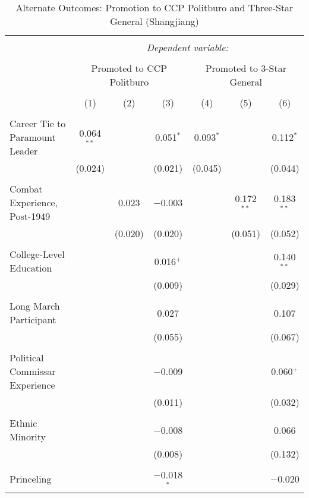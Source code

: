 
\begin{table}[!htbp] \centering 
  \caption{Alternate Outcomes: Promotion to CCP Politburo and Three-Star General (Shangjiang)} 
  \label{table_a4} 
\begin{tabular}{@{\extracolsep{5pt}}lcccccc} 
\\[-1.8ex]\hline 
\hline \\[-1.8ex] 
 & \multicolumn{6}{c}{\textit{Dependent variable:}} \\ 
\cline{2-7} 
\\[-1.8ex] & \multicolumn{3}{c}{Promoted to CCP Politburo} & \multicolumn{3}{c}{Promoted to 3-Star General} \\ 
\\[-1.8ex] & (1) & (2) & (3) & (4) & (5) & (6)\\ 
\hline \\[-1.8ex] 
 Career Tie to Paramount Leader & 0.064$^{**}$ &  & 0.051$^{*}$ & 0.093$^{*}$ &  & 0.112$^{*}$ \\ 
  & (0.024) &  & (0.021) & (0.045) &  & (0.044) \\ 
  & & & & & & \\ 
 Combat Experience, Post-1949 &  & 0.023 & $-$0.003 &  & 0.172$^{**}$ & 0.183$^{**}$ \\ 
  &  & (0.020) & (0.020) &  & (0.051) & (0.052) \\ 
  & & & & & & \\ 
 College-Level Education &  &  & 0.016$^{+}$ &  &  & 0.140$^{**}$ \\ 
  &  &  & (0.009) &  &  & (0.029) \\ 
  & & & & & & \\ 
 Long March Participant &  &  & 0.027 &  &  & 0.107 \\ 
  &  &  & (0.055) &  &  & (0.067) \\ 
  & & & & & & \\ 
 Political Commissar Experience &  &  & $-$0.009 &  &  & 0.060$^{+}$ \\ 
  &  &  & (0.011) &  &  & (0.032) \\ 
  & & & & & & \\ 
 Ethnic Minority &  &  & $-$0.008 &  &  & 0.066 \\ 
  &  &  & (0.008) &  &  & (0.132) \\ 
  & & & & & & \\ 
 Princeling &  &  & $-$0.018$^{*}$ &  &  & $-$0.020 \\ 

\end{tabular}
\end{table}
